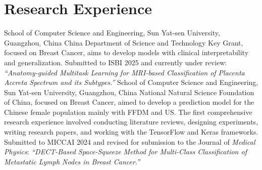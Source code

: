 \documentclass[11pt,a4paper, final]{moderncv}
\begin{document}
\section{\textbf{Research Experience}}%
	{}{}{School of Computer Science and Engineering, Sun Yat-sen University, Guangzhou, China}
	{China Department of Science and Technology Key Grant, focused on Breast Cancer, 
	aims to develop models with clinical interpretability and generalization.}
	{Submitted to ISBI 2025 and currently under review: 
	\emph{``Anatomy-guided Multitask Learning for MRI-based Classification of Placenta Accreta Spectrum and its Subtypes.''}}
	{}{}{School of Computer Science and Engineering, Sun Yat-sen University, Guangzhou, China}
	{National Natural Science Foundation of China, focused on Breast Cancer, 
	aimed to develop a prediction model for the Chinese female population mainly with FFDM and US.}
	{The first comprehensive research experience involved conducting literature reviews, designing experiments, 
	writing research papers, and working with the TensorFlow and Keras frameworks.}
	{Submitted to MICCAI 2024 and revised for submission to the Journal of \emph{Medical Physics}: 
	\emph{``DECT-Based Space-Squeeze Method for Multi-Class Classification of Metastatic Lymph Nodes in Breast Cancer.''}}
\end{document}
